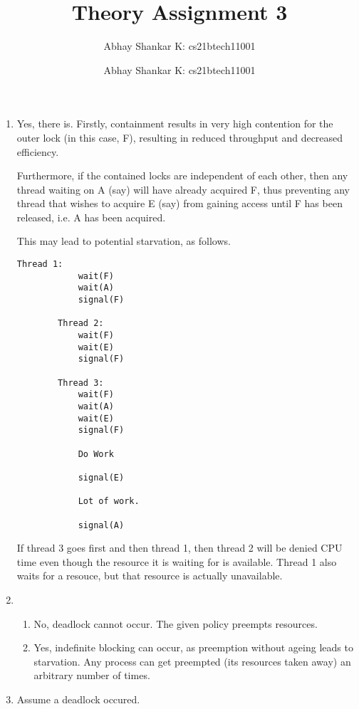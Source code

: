 \documentclass{amsart}
\author{Abhay Shankar K: cs21btech11001}
\newcommand{\me}{
    \author{Abhay Shankar K: cs21btech11001}
    \maketitle
}
\begin{document}
\newcommand{\myvec}[1]{\ensuremath{\begin{pmatrix}#1\end{pmatrix}}} %
\title{Theory Assignment 3}
\me
\begin{enumerate}
    \item 

    Yes, there is. Firstly, containment results in very high contention for the outer lock (in this case, F), resulting in reduced throughput and decreased efficiency.

    Furthermore, if the contained locks are independent of each other, then any thread waiting on A (say) will have already acquired F, thus preventing any thread that wishes to acquire E (say) from gaining access until F has been released, i.e. A has been acquired.

    This may lead to potential starvation, as follows.
    \begin{lstlisting}[escapechar=@]
        Thread 1:
            wait(F)
            wait(A)
            signal(F)

        Thread 2:
            wait(F)
            wait(E)
            signal(F)

        Thread 3:
            wait(F)
            wait(A)
            wait(E)
            signal(F)

            Do Work

            signal(E)

            Lot of work.

            signal(A)
    \end{lstlisting}

    If thread 3 goes first and then thread 1, then thread 2 will be denied CPU time even though the resource it is waiting for is available. Thread 1 also waits for a resouce, but that resource is actually unavailable.

    \item \begin{enumerate}
        \item No, deadlock cannot occur. The given policy preempts resources.
        \item Yes, indefinite blocking can occur, as preemption without ageing leads to starvation. Any process can get preempted (its resources taken away) an arbitrary number of times.
    \end{enumerate}

    \item 
    Assume a deadlock occured.


\end{enumerate}
\end{document}
